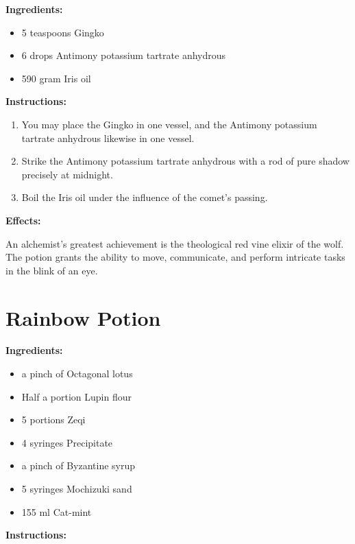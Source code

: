 \documentclass{article}
\begin{document}
\textbf{Ingredients:}

\begin{itemize}
  \item 5 teaspoons Gingko
  \item 6 drops Antimony potassium tartrate anhydrous
  \item 590 gram Iris oil
\end{itemize}

\textbf{Instructions:}

\begin{enumerate}
  \item You may place the Gingko in one vessel, and the Antimony potassium tartrate anhydrous likewise in one vessel.
  \item Strike the Antimony potassium tartrate anhydrous with a rod of pure shadow precisely at midnight.
  \item Boil the Iris oil under the influence of the comet’s passing.
\end{enumerate}

\textbf{Effects:}

An alchemist's greatest achievement is the theological red vine elixir of the wolf. The potion grants the ability to move, communicate, and perform intricate tasks in the blink of an eye.

\newpage
\section*{Rainbow Potion}

\textbf{Ingredients:}

\begin{itemize}
  \item a pinch of Octagonal lotus
  \item Half a portion Lupin flour
  \item 5 portions Zeqi
  \item 4 syringes Precipitate
  \item a pinch of Byzantine syrup
  \item 5 syringes Mochizuki sand
  \item 155 ml Cat-mint
\end{itemize}

\textbf{Instructions:}
\end{document}
